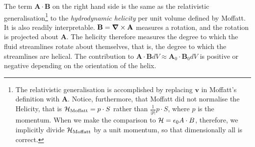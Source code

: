 \documentclass[10pt, fleqn,draft,showtrims,oldfontcommands]{article} %
\newcommand{\eqnref}[1]{\ref{eqn:#1}}
\newcommand{\lr}[1]{\left( #1 \right)}
\newcommand{\del}{\nabla}
\newcommand{\vdel}{ \mbox{\boldmath $\del$}}
\newcommand{\abs}[1]{\left| #1 \right|}
\newcommand{\half}{\tfrac{1}{2}}
\newcommand{\vE}{\vect E}
\newcommand{\vB}{\vect B}
\newcommand{\vP}{\vect P}
\newcommand{\bivector}[1]{{\left< #1 \right>_2}}
\newcommand{\g}{\gamma_0}
\renewcommand{\H}{{\cal H}}
\newcommand{\vect}[1]{\mathbf{#1}}
\newcommand{\vA}{\textbf{A}}
\newcommand{\vv}{\textbf{v}}
\begin{document}
 The term $\vA \cdot \vB$ on the right hand side is the same as the 
relativistic generalisation\footnote{ \label{footnote:dimensionallity_footnote}
The relativistic generalisation is accomplished by replacing $\vv$ in Moffatt's definition with $\vA$.
Notice, furthermore, that Moffatt did not normalise the Helicity,
that is $\H_{\text{Moffatt}} = p\cdot S$ rather than $\frac{1}{\abs{p}}p\cdot S$,
where $p$ is the momentum.
When we make the comparison to $\H = \epsilon_0 A\cdot B$, therefore,
we implicitly divide $\H_{\text{Moffatt}}$ by a unit momentum,
so that dimensionally all is correct.
} to the
{\em hydrodynamic helicity} per unit volume defined by Moffatt\cite{Moffatt1969}.
It is also  readily interpretable.
$\vB = \vdel \times \vA$ measures a rotation,
and the rotation is projected about  $\vA$.
The helicity therefore measures the degree to which the fluid streamlines rotate about themselves,
that is, the degree to which the streamlines are helical\cite{Moffatt1969, Ranada1992}.
The contribution to $\vA \cdot \vB dV \approx \vA_0\cdot \vB_0 dV$
is positive or negative depending on the orientation of the helix\cite{Moffatt1969}.
\end{document}
